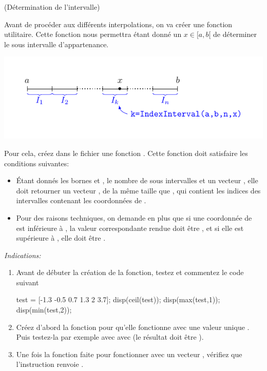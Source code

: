 \documentclass[a4paper,12pt,reqno]{amsart}
\begin{document}
\setcounter{numeroexo}{-1} %
\begin{exo} (Détermination de l'intervalle)

  Avant de procéder aux différents interpolations, on va créer une fonction utilitaire. Cette fonction nous permettra étant donné un $x \in [a,b[$ de déterminer le sous intervalle d'appartenance.

\begin{center}
  \includegraphics[width=15cm]{IndexInterval}
\end{center}

  Pour cela, créez dans le fichier  une fonction . Cette fonction doit satisfaire les conditions suivantes:
  \begin{itemize}
    \item Étant donnés les bornes  et , le nombre de sous intervalles  et un vecteur , elle doit retourner un vecteur , de la même taille que , qui contient les indices des intervalles contenant les coordonnées de .

    \item Pour des raisons techniques, on demande en plus que si une coordonnée de  est inférieure à , la valeur correspondante rendue doit être , et si elle est supérieure à , elle doit être .
  \end{itemize}

  \textit{Indications:}
  \begin{enumerate}
    \item Avant de débuter la création de la fonction, testez et commentez le code suivant
    \begin{scilab}
      test = [-1.3 -0.5 0.7 1.3 2 3.7];
      disp(ceil(test));
      disp(max(test,1));
      disp(min(test,2));
    \end{scilab}

    \item Créez d'abord la fonction pour qu'elle fonctionne avec une valeur unique . Puis testez-la par exemple avec avec  (le résultat doit être ).

    \item Une fois la fonction faite pour fonctionner avec un vecteur , vérifiez que l'instruction  renvoie .
  \end{enumerate}

\end{exo}
\end{document}
